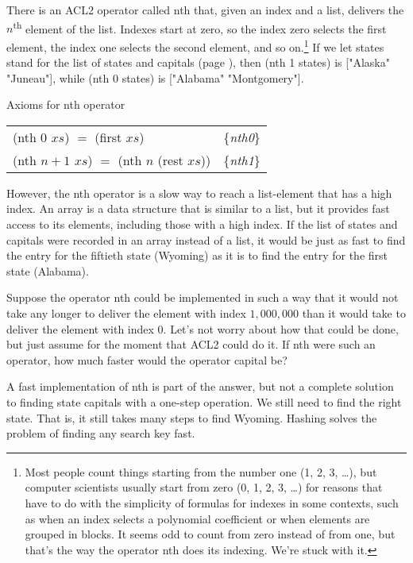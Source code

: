 There is an ACL2 operator called \textsf{nth} that,
given an index and a list, delivers the
$n$\textsuperscript{th} element of the list.
Indexes start at zero, so the index
zero selects the first element,
the index one selects the second element,
and so on.\footnote{Most people
count things starting from the number one (1, 2, 3, \dots), but
computer scientists usually start from zero (0, 1, 2, 3, \dots)
for reasons that have to do with the simplicity 
of formulas for indexes in some contexts, such
as when an index selects a polynomial coefficient
or when elements are grouped in blocks.
It seems odd to count from
zero instead of from one,
but that's the way the operator
\textsf{nth} does its indexing. We're stuck with it.}
If we let \textsf{states} stand for the list of states and capitals
(page \pageref{states-capitals-list}), then
\textsf{(nth 1 states)} is \textsf{["Alaska" "Juneau"]},
while \textsf{(nth 0 states)} is \textsf{["Alabama" "Montgomery"]}.

\begin{center}
Axioms for \textsf{nth} operator
\begin{tabular}{ll}
\textsf{(nth 0} $xs$\textsf{)} $=$ \textsf{(first} $xs$\textsf{)}  & \{\emph{nth0}\}             \\
\textsf{(nth} $n+1$ $xs$\textsf{)} $=$ \textsf{(nth} $n$ \textsf{(rest} $xs$\textsf{))} & \{\emph{nth1}\} \\
\end{tabular}
\end{center}

However, the \textsf{nth} operator is a slow way to reach a
list-element that has a high index.
An array is a data structure that is
similar to a list, but it provides fast access to its
elements, including those with a high index.
If the list of states and capitals were recorded in an array instead
of a list, it would be just as fast to find the entry for the
fiftieth state (Wyoming) as it is to find the entry
for the first state (Alabama).

Suppose the operator \textsf{nth} could be implemented
in such a way that it would not take any longer to
deliver the element with index $1,000,000$ than it would take
to deliver the element with index $0$.
Let's not worry about how that could be done, but
just assume for the moment that ACL2 could do it.
If \textsf{nth} were such an operator,
how much faster would the operator \textsf{capital} be?

A fast implementation of \textsf{nth} is part of the answer,
but not a complete solution to finding state capitals
with a one-step operation.
We still need to find the right state.
That is, it still takes many steps to find Wyoming.
Hashing solves the problem of finding any search key fast.

